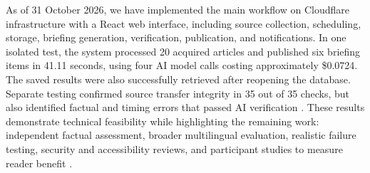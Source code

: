 As of 31 October 2026, we have implemented the main workflow on Cloudflare infrastructure with a React web interface, including source collection, scheduling, storage, briefing generation, verification, publication, and notifications. In one isolated test, the system processed 20 acquired articles and published six briefing items in 41.11 seconds, using four AI model calls costing approximately \$0.0724. The saved results were also successfully retrieved after reopening the database. Separate testing confirmed source transfer integrity in 35 out of 35 checks, but also identified factual and timing errors that passed AI verification \cite{v3twenty,v3overnight}. These results demonstrate technical feasibility while highlighting the remaining work: independent factual assessment, broader multilingual evaluation, realistic failure testing, security and accessibility reviews, and participant studies to measure reader benefit \cite{performanceprotocol,continuity}.